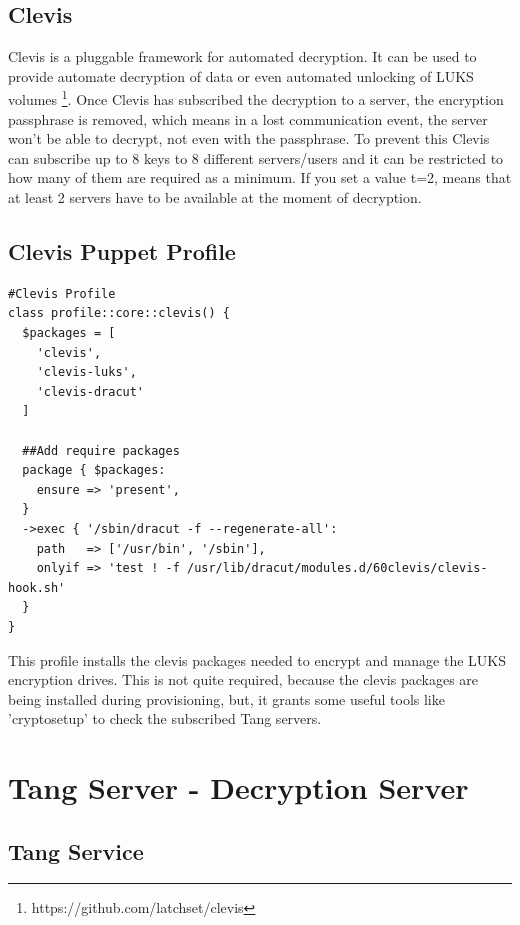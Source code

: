 \newpage
\subsection{Clevis}

Clevis is a pluggable framework for automated decryption. It can be used to provide automate decryption of data or even automated unlocking of LUKS volumes \footnote{https://github.com/latchset/clevis}.
Once Clevis has subscribed the decryption to a server, the encryption passphrase is removed, which means in a lost communication event, the server won't be able to decrypt, not even with the passphrase. To prevent this Clevis can subscribe up to 8 keys to 8 different servers/users and it can be restricted to how many of them are required as a minimum. If you set a value t=2, means that at least 2 servers have to be available at the moment of decryption.


\subsection{Clevis Puppet Profile}
\begin{lstlisting}
#Clevis Profile
class profile::core::clevis() {
  $packages = [
    'clevis',
    'clevis-luks',
    'clevis-dracut'
  ]

  ##Add require packages
  package { $packages:
    ensure => 'present',
  }
  ->exec { '/sbin/dracut -f --regenerate-all':
    path   => ['/usr/bin', '/sbin'],
    onlyif => 'test ! -f /usr/lib/dracut/modules.d/60clevis/clevis-hook.sh'
  }
}
\end{lstlisting}

This profile installs the clevis packages needed to encrypt and manage the LUKS encryption drives. This is not quite required, because the clevis packages are being installed during provisioning, but, it grants some useful tools like 'cryptosetup' to check the subscribed Tang servers.

\newpage
\section{Tang Server - Decryption Server}

\subsection{Tang Service}

